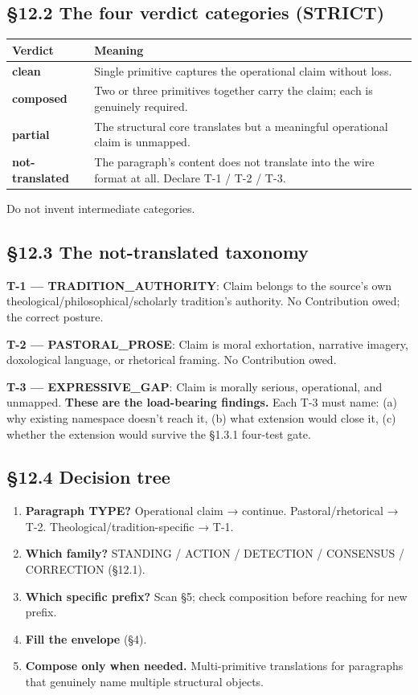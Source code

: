 \documentclass[11pt]{article}
\begin{document}
\subsection*{§12.2 The four verdict categories (STRICT)}


{\footnotesize
\begin{longtable}{|p{8.0cm}|p{8.0cm}|}\hline
\textbf{Verdict} & \textbf{Meaning} \\ \hline\endhead
\textbf{clean} & Single primitive captures the operational claim without loss. \\ \hline
\textbf{composed} & Two or three primitives together carry the claim; each is genuinely required. \\ \hline
\textbf{partial} & The structural core translates but a meaningful operational claim is unmapped. \\ \hline
\textbf{not-translated} & The paragraph's content does not translate into the wire format at all. Declare T-1 / T-2 / T-3. \\ \hline
\end{longtable}}


Do not invent intermediate categories.


\subsection*{§12.3 The not-translated taxonomy}


\textbf{T-1 — TRADITION\_AUTHORITY}: Claim belongs to the source's own theological/philosophical/scholarly tradition's authority. No Contribution owed; the correct posture.


\textbf{T-2 — PASTORAL\_PROSE}: Claim is moral exhortation, narrative imagery, doxological language, or rhetorical framing. No Contribution owed.


\textbf{T-3 — EXPRESSIVE\_GAP}: Claim is morally serious, operational, and unmapped. \textbf{These are the load-bearing findings.} Each T-3 must name: (a) why existing namespace doesn't reach it, (b) what extension would close it, (c) whether the extension would survive the §1.3.1 four-test gate.


\subsection*{§12.4 Decision tree}


\begin{enumerate}\setlength\itemsep{0pt}
\item \textbf{Paragraph TYPE?} Operational claim → continue. Pastoral/rhetorical → T-2. Theological/tradition-specific → T-1.
\item \textbf{Which family?} STANDING / ACTION / DETECTION / CONSENSUS / CORRECTION (§12.1).
\item \textbf{Which specific prefix?} Scan §5; check composition before reaching for new prefix.
\item \textbf{Fill the envelope} (§4).
\item \textbf{Compose only when needed.} Multi-primitive translations for paragraphs that genuinely name multiple structural objects.
\end{enumerate}
\end{document}
